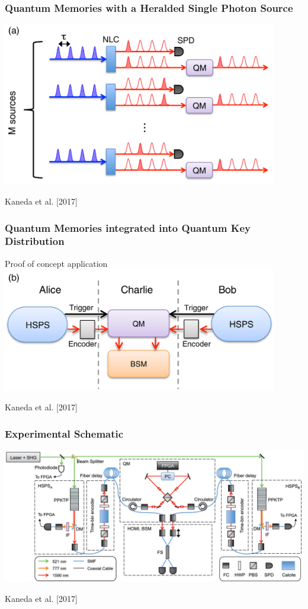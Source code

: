 \documentclass{beamer}
\begin{document}
\begin{frame}\frametitle{Quantum Memories with a Heralded Single Photon Source}
    \centering
    \includegraphics[width=0.9\textwidth]{Images/CoInSchem.jpg}

    \tiny{Kaneda et al. [2017]}
\end{frame}

\begin{frame}\frametitle{Quantum Memories integrated into Quantum Key Distribution}
    Proof of concept application
    \centering
    \includegraphics[width=0.9\textwidth]{Images/QMQKD.jpg}

    \tiny{Kaneda et al. [2017]}
\end{frame}

\begin{frame}\frametitle{Experimental Schematic}
    \centering
    \includegraphics[width=1.0\textwidth]{Images/Figure2.jpg}

    \tiny{Kaneda et al. [2017]}
\end{frame}
\end{document}
